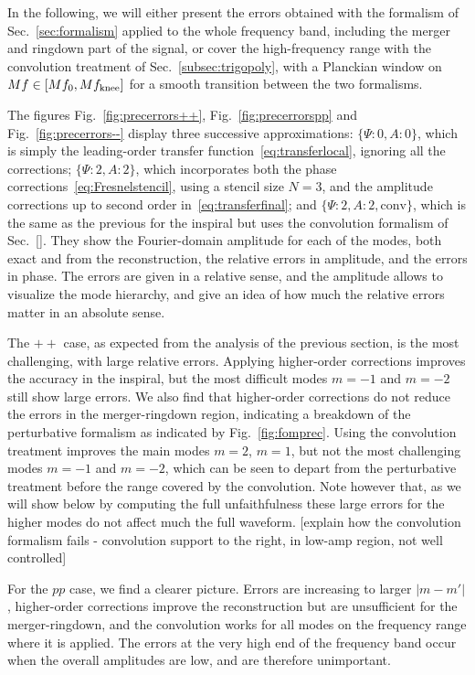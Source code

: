 \documentclass[aps,showpacs,twocolumn,
prd,superscriptaddress,nofootinbib]{revtex4-1}
\newcommand{\SM}[1]{{\color{Red} #1}}
\begin{document}
In the following, we will either present the errors obtained with the formalism of Sec.~\ref{sec:formalism} applied to the whole frequency band, including the merger and ringdown part of the signal, or cover the high-frequency range with the convolution treatment of Sec.~\ref{subsec:trigopoly}, with a Planckian window on $Mf\in [Mf_{0}, Mf_{\rm knee}]$ for a smooth transition between the two formalisms.

The figures Fig.~\ref{fig:precerrors++}, Fig.~\ref{fig:precerrorspp} and Fig.~\ref{fig:precerrors--} display three successive approximations: $\{\Psi:0,A:0\}$, which is simply the leading-order transfer function~\eqref{eq:transferlocal}, ignoring all the corrections; $\{\Psi:2,A:2\}$, which incorporates both the phase corrections~\eqref{eq:Fresnelstencil}, using a stencil size $N=3$, and the amplitude corrections up to second order in~\eqref{eq:transferfinal}; and $\{\Psi:2,A:2,\text{conv}\}$, which is the same as the previous for the inspiral but uses the convolution formalism of Sec.~\ref{}. They show the Fourier-domain amplitude for each of the modes, both exact and from the reconstruction, the relative errors in amplitude, and the errors in phase. The errors are given in a relative sense, and the amplitude allows to visualize the mode hierarchy, and give an idea of how much the relative errors matter in an absolute sense.

The $++$ case, as expected from the analysis of the previous section, is the most challenging, with large relative errors. Applying higher-order corrections improves the accuracy in the inspiral, but the most difficult modes $m=-1$ and $m=-2$ still show large errors. We also find that higher-order corrections do not reduce the errors in the merger-ringdown region, indicating a breakdown of the perturbative formalism as indicated by Fig.~\ref{fig:fomprec}. Using the convolution treatment improves the main modes $m=2$, $m=1$, but not the most challenging modes $m=-1$ and $m=-2$, which can be seen to depart from the perturbative treatment before the range covered by the convolution. Note however that, as we will show below by computing the full unfaithfulness these large errors for the higher modes do not affect much the full waveform.
\SM{[explain how the convolution formalism fails - convolution support to the right, in low-amp region, not well controlled]}

For the $pp$ case, we find a clearer picture. Errors are increasing to larger $|m-m'|$, higher-order corrections improve the reconstruction but are unsufficient for the merger-ringdown, and the convolution works for all modes on the frequency range where it is applied. The errors at the very high end of the frequency band occur when the overall amplitudes are low, and are therefore unimportant. 
\end{document}
